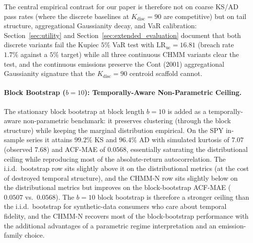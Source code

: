 The central empirical contrast for our paper is therefore not on coarse KS/AD pass rates (where the discrete baselines at $K_{\text{disc}} = 90$ are competitive) but on tail structure, aggregational Gaussianity decay, and VaR calibration: Section~\ref{sec:utility} and Section~\ref{sec:extended_evaluation} document that both discrete variants fail the Kupiec $5\%$ VaR test with $\text{LR}_{\text{uc}} = 16.81$ (breach rate $1.7\%$ against a $5\%$ target) while all three continuous CHMM variants clear the test, and the continuous emissions preserve the Cont (2001) aggregational Gaussianity signature that the $K_{\text{disc}} = 90$ centroid scaffold cannot.

\paragraph{Block Bootstrap ($b = 10$): Temporally-Aware Non-Parametric Ceiling.}
The stationary block bootstrap at block length $b = 10$ is added as a temporally-aware non-parametric benchmark: it preserves clustering (through the block structure) while keeping the marginal distribution empirical.
On the SPY in-sample series it attains $99.2\%$ KS and $96.4\%$ AD with simulated kurtosis of $7.07$ (observed $7.68$) and ACF-MAE of $0.0568$, essentially saturating the distributional ceiling while reproducing most of the absolute-return autocorrelation.
The i.i.d.\ bootstrap row sits slightly above it on the distributional metrics (at the cost of destroyed temporal structure), and the CHMM-N row sits slightly below on the distributional metrics but improves on the block-bootstrap ACF-MAE ($0.0507$ vs.\ $0.0568$).
The $b = 10$ block bootstrap is therefore a stronger ceiling than the i.i.d.\ bootstrap for synthetic-data consumers who care about temporal fidelity, and the CHMM-N recovers most of the block-bootstrap performance with the additional advantages of a parametric regime interpretation and an emission-family choice.

